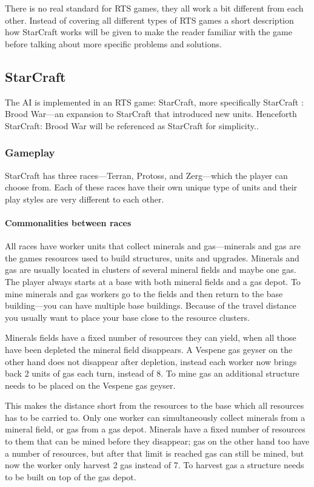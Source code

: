 There is no real standard for RTS games, they all work a bit different from each other. Instead of covering all different types of RTS games a short description how StarCraft works will be given to make the reader familiar with the game before talking about more specific problems and solutions.

\subsection{StarCraft}
The AI is implemented in an RTS game: StarCraft, more specifically StarCraft : Brood War—an expansion to StarCraft that introduced new units. Henceforth StarCraft: Brood War will be referenced as StarCraft for simplicity..


\subsubsection{Gameplay}
StarCraft has three races—Terran, Protoss, and Zerg—which the player can choose from. Each of these races have their own unique type of units and their play styles are very different to each other.

\paragraph{Commonalities between races}
All races have worker units that collect minerals and gas—minerals and gas are the games resources used to build structures, units and upgrades. Minerals and gas are usually located in clusters of several mineral fields and maybe one gas. The player always starts at a base with both mineral fields and a gas depot. To mine minerals and gas workers go to the fields and then return to the base building—you can have multiple base buildings. Because of the travel distance you usually want to place your base close to the resource clusters.

Minerals fields have a fixed number of resources they can yield, when all those have been depleted the mineral field disappears. A Vespene gas geyser on the other hand does not disappear after depletion, instead each worker now brings back 2 units of gas each turn, instead of 8. To mine gas an additional structure needs to be placed on the Vespene gas geyser. 

This makes the distance short from the resources to the base which all resources has to be carried to. Only one worker can simultaneously collect minerals from a mineral field, or gas from a gas depot. Minerals have a fixed number of resources to them that can be mined before they disappear; gas on the other hand too have a number of resources, but after that limit is reached gas can still be mined, but now the worker only harvest 2 gas instead of 7. To harvest gas a structure needs to be built on top of the gas depot.

